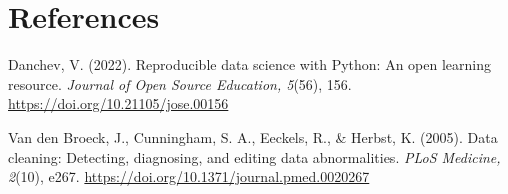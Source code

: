 \documentclass[12pt]{article}
\begin{document}
\section*{References}
Danchev, V. (2022). Reproducible data science with Python: An open learning resource. \textit{Journal of Open Source Education, 5}(56), 156. \url{https://doi.org/10.21105/jose.00156}

Van den Broeck, J., Cunningham, S. A., Eeckels, R., \& Herbst, K. (2005). Data cleaning: Detecting, diagnosing, and editing data abnormalities. \textit{PLoS Medicine, 2}(10), e267. \url{https://doi.org/10.1371/journal.pmed.0020267}
\end{document}
